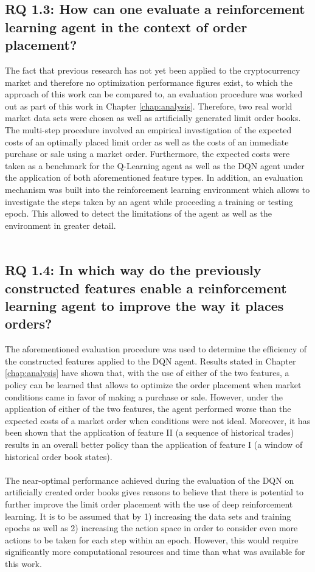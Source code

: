 \subsection{RQ 1.3: How can one evaluate a reinforcement learning agent in the context of order placement?}

    The fact that previous research has not yet been applied to the cryptocurrency market and therefore no optimization performance figures exist, to which the approach of this work can be compared to, an evaluation procedure was worked out as part of this work in Chapter \ref{chap:analysis}.
    Therefore, two real world market data sets were chosen as well as artificially generated limit order books.
    The multi-step procedure involved an empirical investigation of the expected costs of an optimally placed limit order as well as the costs of an immediate purchase or sale using a market order.
    Furthermore, the expected costs were taken as a benchmark for the Q-Learning agent as well as the DQN agent under the application of both aforementioned feature types.
    In addition, an evaluation mechanism was built into the reinforcement learning environment which allows to investigate the steps taken by an agent while proceeding a training or testing epoch.
    This allowed to detect the limitations of the agent as well as the environment in greater detail.
    \\
    \\
    
    
    
\subsection{RQ 1.4: In which way do the previously constructed features enable a reinforcement learning agent to improve the way it places orders?}

    The aforementioned evaluation procedure was used to determine the efficiency of the constructed features applied to the DQN agent.
    Results stated in Chapter \ref{chap:analysis} have shown that, with the use of either of the two features, a policy can be learned that allows to optimize the order placement when market conditions came in favor of making a purchase or sale.
    However, under the application of either of the two features, the agent performed worse than the expected costs of a market order when conditions were not ideal.
    Moreover, it has been shown that the application of feature II (a sequence of historical trades) results in an overall better policy than the application of feature I (a window of historical order book states).
    \\
    \\
The near-optimal performance achieved during the evaluation of the DQN on artificially created order books gives reasons to believe that there is potential to further improve the limit order placement with the use of deep reinforcement learning.
It is to be assumed that by 1) increasing the data sets and training epochs as well as 2) increasing the action space in order to consider even more actions to be taken for each step within an epoch.
However, this would require significantly more computational resources and time than what was available for this work.


